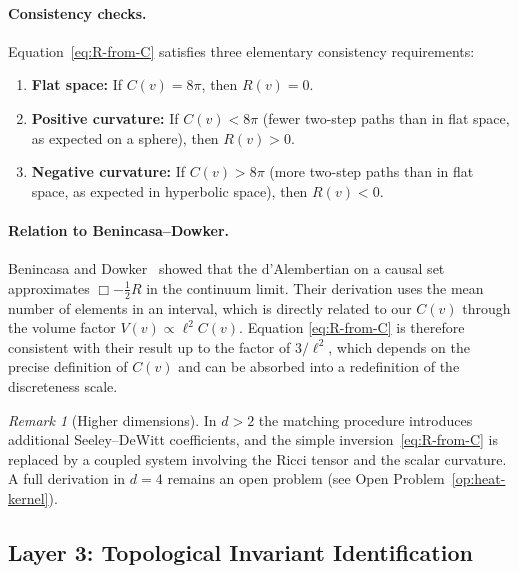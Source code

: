 \documentclass[11pt,a4paper]{article}
\theoremstyle{definition}
\theoremstyle{remark}
\newtheorem{remark}{Remark}[section]
\begin{document}
\paragraph{Consistency checks.}  Equation~\eqref{eq:R-from-C} satisfies three
elementary consistency requirements:
\begin{enumerate}[noitemsep]
\item \textbf{Flat space:} If $C(v)=8\pi$, then $R(v)=0$.
\item \textbf{Positive curvature:} If $C(v)<8\pi$ (fewer two-step paths than
in flat space, as expected on a sphere), then $R(v)>0$.
\item \textbf{Negative curvature:} If $C(v)>8\pi$ (more two-step paths than
in flat space, as expected in hyperbolic space), then $R(v)<0$.
\end{enumerate}

\paragraph{Relation to Benincasa--Dowker.}  Benincasa and
Dowker~\cite{Benincasa2010} showed that the d'Alembertian on a causal set
approximates $\Box - \tfrac{1}{2}R$ in the continuum limit.  Their derivation
uses the mean number of elements in an interval, which is directly related to
our $C(v)$ through the volume factor $V(v)\propto\ell^{2}C(v)$.  Equation
\eqref{eq:R-from-C} is therefore consistent with their result up to the
factor of $3/\ell^{2}$, which depends on the precise definition of $C(v)$ and
can be absorbed into a redefinition of the discreteness scale.

\begin{remark}[Higher dimensions]
In $d>2$ the matching procedure introduces additional Seeley--DeWitt
coefficients, and the simple inversion~\eqref{eq:R-from-C} is replaced by a
coupled system involving the Ricci tensor and the scalar curvature.  A full
derivation in $d=4$ remains an open problem (see Open
Problem~\ref{op:heat-kernel}).
\end{remark}

\subsection{Layer 3: Topological Invariant Identification}\label{subsec:layer3}
\end{document}
